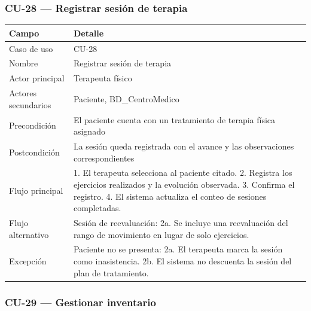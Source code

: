 \documentclass[11pt,a4paper]{article}
\begin{document}
	\subsubsection{CU-28 --- Registrar sesión de terapia}
	
	\begin{longtable}{p{} p{} }
		\toprule
		\textbf{Campo} & \textbf{Detalle} \\
		\midrule
		\endhead
		Caso de uso & CU-28 \\
		Nombre & Registrar sesión de terapia \\
		Actor principal & Terapeuta físico \\
		Actores secundarios & Paciente, BD\_CentroMedico \\
		Precondición & El paciente cuenta con un tratamiento de terapia física asignado \\
		Postcondición & La sesión queda registrada con el avance y las observaciones correspondientes \\
		Flujo principal & 1. El terapeuta selecciona al paciente citado. 2. Registra los ejercicios realizados y la evolución observada. 3. Confirma el registro. 4. El sistema actualiza el conteo de sesiones completadas. \\
		Flujo alternativo & Sesión de reevaluación: 2a. Se incluye una reevaluación del rango de movimiento en lugar de solo ejercicios. \\
		Excepción & Paciente no se presenta: 2a. El terapeuta marca la sesión como inasistencia. 2b. El sistema no descuenta la sesión del plan de tratamiento. \\
		\bottomrule
	\end{longtable}
	
	\subsubsection{CU-29 --- Gestionar inventario}
	
\end{document}
